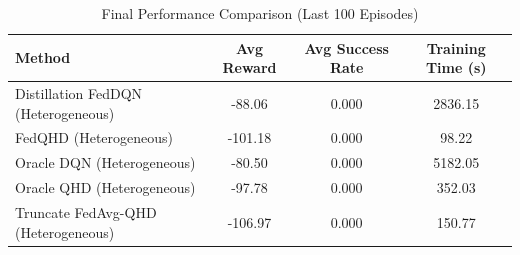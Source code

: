 \begin{table}[t]
\centering
\caption{Final Performance Comparison (Last 100 Episodes)}
\label{tab:performance_summary}
\begin{tabular}{lccc}
\toprule
Method & Avg Reward & Avg Success Rate & Training Time (s) \\
\midrule
Distillation FedDQN (Heterogeneous) & -88.06 & 0.000 & 2836.15 \\
FedQHD (Heterogeneous) & -101.18 & 0.000 & 98.22 \\
Oracle DQN (Heterogeneous) & -80.50 & 0.000 & 5182.05 \\
Oracle QHD (Heterogeneous) & -97.78 & 0.000 & 352.03 \\
Truncate FedAvg-QHD (Heterogeneous) & -106.97 & 0.000 & 150.77 \\
\bottomrule
\end{tabular}
\end{table}